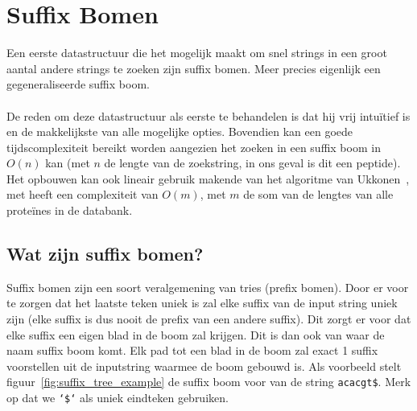 \chapter{Suffix Bomen}\label{ch:suffix-bomen}
Een eerste datastructuur die het mogelijk maakt om snel strings in een groot aantal andere strings te zoeken zijn suffix bomen.
Meer precies eigenlijk een gegeneraliseerde suffix boom.
\\ \\
De reden om deze datastructuur als eerste te behandelen is dat hij vrij intuïtief is en de makkelijkste van alle mogelijke opties.
Bovendien kan een goede tijdscomplexiteit bereikt worden aangezien het zoeken in een suffix boom in $O(n)$ kan (met $n$ de lengte van de zoekstring, in ons geval is dit een peptide).
Het opbouwen kan ook lineair gebruik makende van het algoritme van Ukkonen~\cite{Ukkonen1995}, met heeft een complexiteit van $O(m)$, met $m$ de som van de lengtes van alle proteïnes in de databank.


\section{Wat zijn suffix bomen?}\label{sec:wat-zijn-suffix-bomen?}
Suffix bomen zijn een soort veralgemening van tries (prefix bomen).
Door er voor te zorgen dat het laatste teken uniek is zal elke suffix van de input string uniek zijn (elke suffix is dus nooit de prefix van een andere suffix).
Dit zorgt er voor dat elke suffix een eigen blad in de boom zal krijgen.
Dit is dan ook van waar de naam suffix boom komt.
Elk pad tot een blad in de boom zal exact 1 suffix voorstellen uit de inputstring waarmee de boom gebouwd is.
Als voorbeeld stelt figuur~\ref{fig:suffix_tree_example} de suffix boom voor van de string \texttt{acacgt\$}.
Merk op dat we \texttt{`\$`} als uniek eindteken gebruiken.

